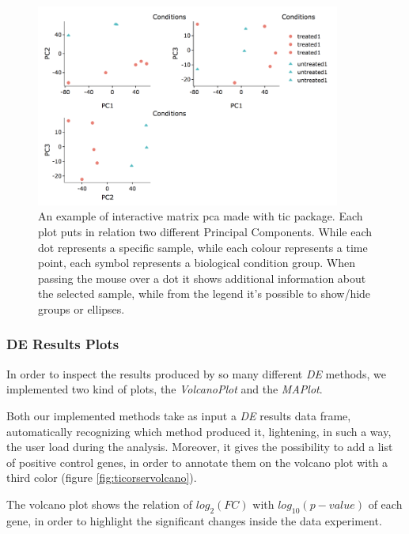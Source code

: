 \begin{figure}[H]
\centering
\includegraphics[width=10cm, keepaspectratio]{img/ticorser/pcas.png}
\caption[ticorser pca]{An example of interactive matrix \gls{pca} made with \gls{tic} package. Each plot puts in relation two different Principal Components. While each dot represents a specific sample, while each colour represents a time point, each symbol represents a biological condition group. When passing the mouse over a dot it shows additional information about the selected sample, while from the legend it's possible to show/hide groups or ellipses.}
\label{fig:ticorserpcas}

\end{figure}

\subsubsection{DE Results Plots}
In order to inspect the results produced by so many different \textit{DE} methods, we implemented two kind of plots, the \textit{VolcanoPlot} and the \textit{MAPlot}.

Both our implemented methods take as input a \textit{DE} results data frame, automatically recognizing which method produced it, lightening, in such a way, the user load during the analysis.
Moreover, it gives the possibility to add a list of positive control genes, in order to annotate them on the volcano plot with a third color (figure \ref{fig:ticorservolcano}).

The volcano plot shows the relation of $log_2(FC)$ with $log_{10}(p-value)$ of each gene, in order to highlight the significant changes inside the data experiment.

